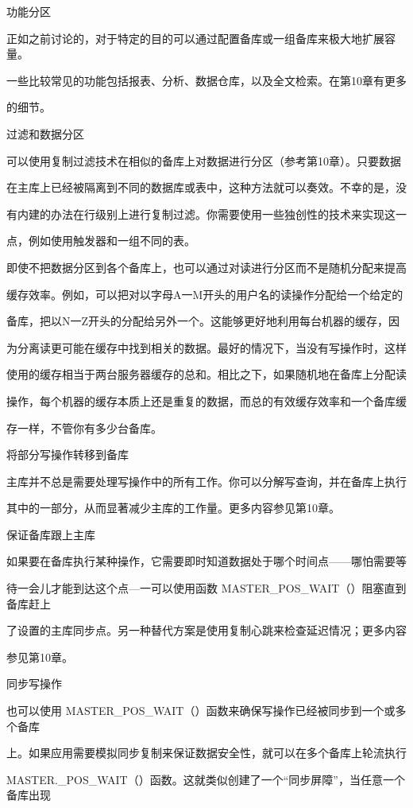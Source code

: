 功能分区

正如之前讨论的，对于特定的目的可以通过配置备库或一组备库来极大地扩展容量。

一些比较常见的功能包括报表、分析、数据仓库，以及全文检索。在第10章有更多

的细节。

过滤和数据分区

可以使用复制过滤技术在相似的备库上对数据进行分区（参考第10章）。只要数据

在主库上已经被隔离到不同的数据库或表中，这种方法就可以奏效。不幸的是，没

有内建的办法在行级别上进行复制过滤。你需要使用一些独创性的技术来实现这一

点，例如使用触发器和一组不同的表。

即使不把数据分区到各个备库上，也可以通过对读进行分区而不是随机分配来提高

缓存效率。例如，可以把对以字母A一M开头的用户名的读操作分配给一个给定的

备库，把以N一Z开头的分配给另外一个。这能够更好地利用每台机器的缓存，因

为分离读更可能在缓存中找到相关的数据。最好的情况下，当没有写操作时，这样

使用的缓存相当于两台服务器缓存的总和。相比之下，如果随机地在备库上分配读

操作，每个机器的缓存本质上还是重复的数据，而总的有效缓存效率和一个备库缓

存一样，不管你有多少台备库。

将部分写操作转移到备库

主库并不总是需要处理写操作中的所有工作。你可以分解写查询，并在备库上执行

其中的一部分，从而显著减少主库的工作量。更多内容参见第10章。

保证备库跟上主库

如果要在备库执行某种操作，它需要即时知道数据处于哪个时间点——哪怕需要等

待一会儿才能到达这个点—一可以使用函数 MASTER\_POS\_WAIT（）阻塞直到备库赶上

了设置的主库同步点。另一种替代方案是使用复制心跳来检查延迟情况；更多内容

参见第10章。

同步写操作

也可以使用 MASTER\_POS\_WAIT（）函数来确保写操作已经被同步到一个或多个备库

上。如果应用需要模拟同步复制来保证数据安全性，就可以在多个备库上轮流执行

MASTER.\_POS\_WAIT（）函数。这就类似创建了一个“同步屏障”，当任意一个备库出现

